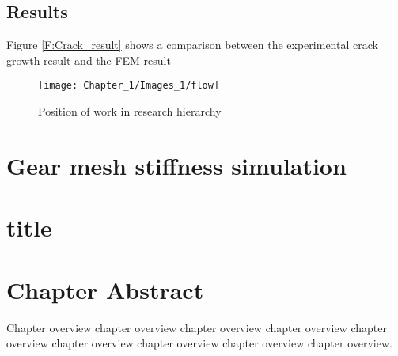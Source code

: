 \subsection{Results}

Figure \ref{F:Crack_result} shows a comparison between the experimental crack growth result and the FEM result
\begin{figure}[H]
	\centering
	\texttt{[image: Chapter\_1/Images\_1/flow]}
	\caption{Position of work in research hierarchy}
	\label{F:Hierarchy}
\end{figure}




\section{Gear mesh stiffness simulation}






\section{}


\section{title}

\section{Chapter Abstract}

Chapter overview chapter overview chapter overview chapter overview
chapter overview chapter overview chapter overview chapter overview
chapter overview.

